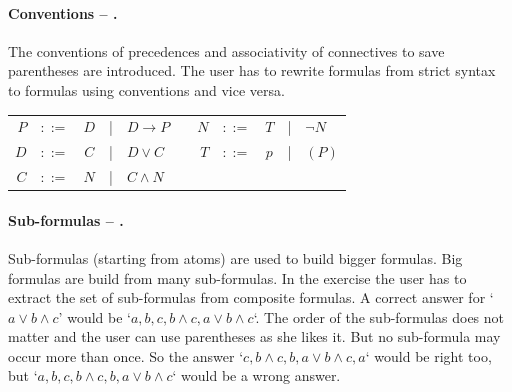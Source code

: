 \paragraph{Conventions – .}
\label{tut:22}
The conventions of precedences and associativity  of connectives to save parentheses are introduced. 
The user has to rewrite formulas from strict syntax to formulas using conventions and vice versa.

\begin{center}
\begin{tabular}{rccclp{1cm}rcccl}
$P$		&$::=$ & $D$ &|& $D \rightarrow P$ 	&& $N$		&$::=$ & $T$ &|& $\neg N$ \\
$D$		&$::=$ & $C$ &|& $D \vee C$		&& $T$		&$::=$ & $p$ &|& $(P)$		\\
$C$		&$::=$ & $N$ &|& $C \wedge N$ 		\\
\end{tabular}
\end{center}


\paragraph{Sub-formulas – .}
\label{tut:23}
Sub-formulas (starting from atoms) are used to build bigger formulas. Big formulas are build from many sub-formulas.
In the exercise the user has to extract the set of sub-formulas from composite formulas. 
A correct answer for 
‘$a \vee b \wedge c$’ would be
‘$a,b,c,b\wedge c, a \vee b \wedge c$‘. 
The order of the sub-formulas does not matter and the user can use parentheses as she likes it.
But no sub-formula may occur more than once. 
So the answer ‘$c, b\wedge c, b, a \vee b \wedge c, a$‘ would be right too, 
but ‘$a,b,c,b\wedge c, b, a \vee b \wedge c$‘ would be a wrong answer.

